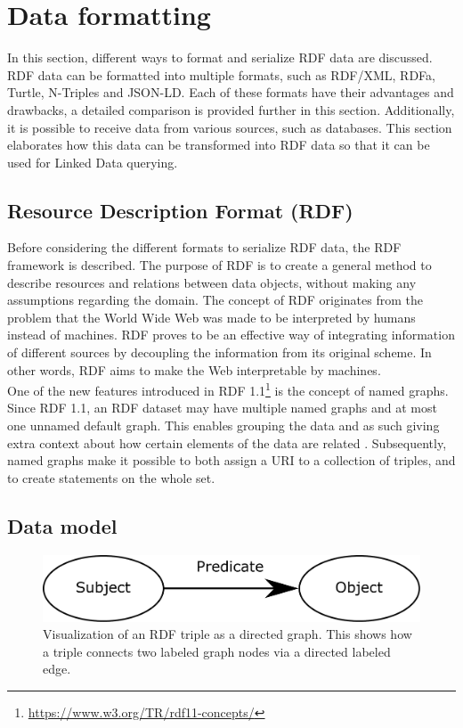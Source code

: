 \section{Data formatting}\label{sec:formatting}
In this section, different ways to format and serialize RDF data are discussed. RDF data can be formatted into multiple formats, such as RDF/XML\cite{manola2004rdf}, RDFa\cite{herman2015rdfa}, Turtle\cite{beckett2014rdfturtle}, N-Triples\cite{beckett2014rdfntriples} and JSON-LD\cite{sporny2012json}. Each of these formats have their advantages and drawbacks, a detailed comparison is provided further in this section. Additionally, it is possible to receive data from various sources, such as databases. This section elaborates how this data can be transformed into RDF data so that it can be used for Linked Data querying.

\subsection{Resource Description Format (RDF)}\label{ssec:formatting-RDF}
Before considering the different formats to serialize RDF data, the RDF framework is described. The purpose of RDF is to create a general method to describe resources and relations between data objects, without making any assumptions regarding the domain. The concept of RDF originates from the problem that the World Wide Web was made to be interpreted by humans instead of machines. RDF proves to be an effective way of integrating information of different sources by decoupling the information from its original scheme. In other words, RDF aims to make the Web interpretable by machines\cite{lassila1998resource}.\\

\noindent One of the new features introduced in RDF 1.1\footnote{\url{https://www.w3.org/TR/rdf11-concepts/}} is the concept of named graphs. Since RDF 1.1, an RDF dataset may have multiple named graphs and at most one unnamed default graph. This enables grouping the data and as such giving extra context about how certain elements of the data are related \cite{schreiber2014rdf}. Subsequently, named graphs make it possible to both assign a URI to a collection of triples, and to create statements on the whole set.

\subsection{Data model}
\begin{figure}[htbp!]
    \centering
    \includegraphics[width=\textwidth]{images/spo.pdf}
    \caption{Visualization of an RDF triple as a directed graph. This shows how a triple connects two labeled graph nodes via a directed labeled edge.}
    \label{fig:spo}
\end{figure}

